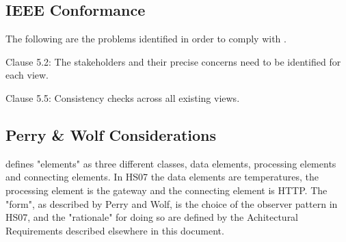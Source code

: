 \documentclass[a4paper,10pt]{article}
\begin{document}
\subsection{IEEE Conformance}


The following are the problems identified in order to comply with \cite{ieeerecommendedpractice}.

Clause 5.2: The stakeholders and their precise concerns need to be identified for each view. 

Clause 5.5: Consistency checks across all existing views.

\subsection{Perry \& Wolf Considerations}

\cite{perrywolf1992} defines "elements" as three different classes, data elements, processing elements and connecting elements. In HS07 the data elements are temperatures, the processing element is the gateway and the connecting element is HTTP. The "form", as described by Perry and Wolf, is the choice of the observer pattern in HS07, and the "rationale" for doing so are defined by the Achitectural Requirements described elsewhere in this document.



\end{document}
